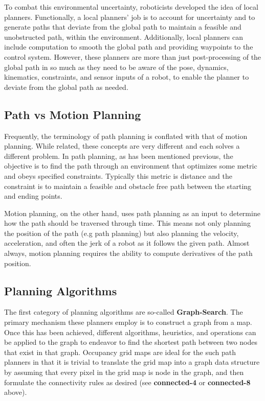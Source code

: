 To combat this environmental uncertainty, roboticists developed the idea of local planners. Functionally, a local planners' job is to account for uncertainty and to generate paths that deviate from the global path to maintain a feasible and unobstructed path, within the environment. Additionally, local planners can include computation to smooth the global path and providing waypoints to the control system. However, these planners are more than just post-processing of the global path in so much as they need to be aware of the pose, dynamics, kinematics, constraints, and sensor inputs of a robot, to enable the planner to deviate from the global path as needed.

\subsection{Path vs Motion Planning}
Frequently, the terminology of path planning is conflated with that of motion planning. While related, these concepts are very different and each solves a different problem. In path planning, as has been mentioned previous, the objective is to find the path through an environment that optimizes some metric and obeys specified constraints. Typically this metric is distance and the constraint is to maintain a feasible and obstacle free path between the starting and ending points. 

Motion planning, on the other hand, uses path planning as an input to determine how the path should be traversed through time. This means not only planning the position of the path (e.g path planning) but also planning the velocity, acceleration, and often the jerk of a robot as it follows the given path. Almost always, motion planning requires the ability to compute derivatives of the path position. 

\subsection{Planning Algorithms}

The first category of planning algorithms are so-called \textbf{Graph-Search}. The primary mechanism these planners employ is to construct a graph from a map. Once this has been achieved, different algorithms, heuristics, and operations can be applied to the graph to endeavor to find the shortest path between two nodes that exist in that graph. Occupancy grid maps are ideal for the such path planners in that it is trivial to translate the grid map into a graph data structure by assuming that every pixel in the grid map is node in the graph, and then formulate the connectivity rules as desired (see \textbf{connected-4} or \textbf{connected-8} above). 

